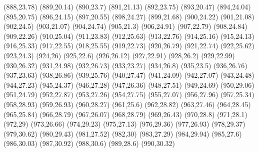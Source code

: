 (888,23.78)
(889,20.14)
(890,23.7)
(891,21.13)
(892,23.75)
(893,20.47)
(894,24.04)
(895,20.75)
(896,24.15)
(897,20.55)
(898,24.27)
(899,21.68)
(900,24.22)
(901,21.08)
(902,24.5)
(903,21.07)
(904,24.74)
(905,21.3)
(906,24.91)
(907,22.79)
(908,24.84)
(909,22.26)
(910,25.04)
(911,23.83)
(912,25.63)
(913,22.76)
(914,25.16)
(915,24.13)
(916,25.33)
(917,22.55)
(918,25.55)
(919,22.73)
(920,26.79)
(921,22.74)
(922,25.62)
(923,24.3)
(924,26)
(925,22.6)
(926,26.12)
(927,22.91)
(928,26.2)
(929,22.99)
(930,26.32)
(931,24.98)
(932,26.73)
(933,23.27)
(934,26.8)
(935,23.5)
(936,26.76)
(937,23.63)
(938,26.86)
(939,25.76)
(940,27.47)
(941,24.09)
(942,27.07)
(943,24.48)
(944,27.23)
(945,24.37)
(946,27.28)
(947,26.36)
(948,27.51)
(949,24.69)
(950,29.06)
(951,24.79)
(952,27.87)
(953,27.26)
(954,27.75)
(955,27.07)
(956,27.96)
(957,25.34)
(958,28.93)
(959,26.93)
(960,28.27)
(961,25.6)
(962,28.82)
(963,27.46)
(964,28.45)
(965,25.84)
(966,28.79)
(967,26.07)
(968,28.79)
(969,26.43)
(970,28.8)
(971,28.1)
(972,29)
(973,26.66)
(974,29.23)
(975,27.13)
(976,29.36)
(977,26.93)
(978,29.37)
(979,30.62)
(980,29.43)
(981,27.52)
(982,30)
(983,27.29)
(984,29.94)
(985,27.6)
(986,30.03)
(987,30.92)
(988,30.6)
(989,28.6)
(990,30.32)
